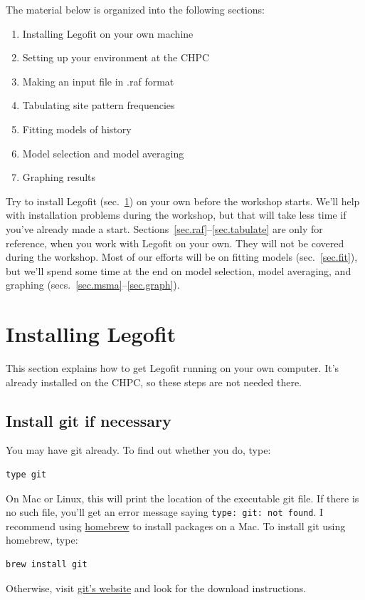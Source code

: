 \documentclass[11pt]{article}
\begin{document}
The material below is organized into the following sections:
\begin{enumerate}
\item[\ref{sec.install}] Installing Legofit on your own machine
\item[\ref{sec.chpc}] Setting up your environment at the CHPC  
\item[\ref{sec.raf}] Making an input file in .raf format
\item[\ref{sec.tabulate}] Tabulating site pattern frequencies
\item[\ref{sec.fit}] Fitting models of history
\item[\ref{sec.msma}] Model selection and model averaging
\item[\ref{sec.graph}] Graphing results
\end{enumerate}
Try to install Legofit (sec.~\ref{sec.install}) on your own before the
workshop starts. We'll help with installation problems during the
workshop, but that will take less time if you've already made a start.
Sections~\ref{sec.raf}--\ref{sec.tabulate} are only for reference,
when you work with Legofit on your own. They will not be covered
during the workshop. Most of our efforts will be on fitting models
(sec.~\ref{sec.fit}), but we'll spend some time at the end on model
selection, model averaging, and graphing
(secs.~\ref{sec.msma}--\ref{sec.graph}).

\section{Installing Legofit}
\label{sec.install}
This section explains how to get Legofit running on your own
computer. It's already installed on the CHPC, so these steps are not
 needed there.
\subsection{Install git if necessary}
You may have git already. To find out whether you do, type:
\begin{verbatim}
type git
\end{verbatim}
On Mac or Linux, this will print the location of the executable git
file. If there is no such file, you'll get an error message saying
\verb|type: git: not found|. I recommend using
\href{https://brew.sh}{homebrew} to install packages on a Mac. To
install git using homebrew, type:
\begin{verbatim}
brew install git
\end{verbatim}
Otherwise, visit \href{https://git-scm.com}{git's website} and look
for the download instructions.
\end{document}
